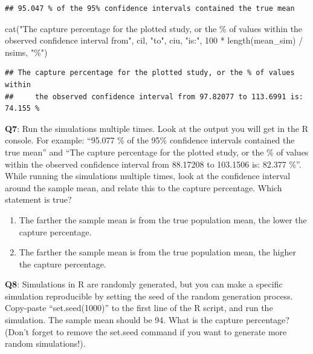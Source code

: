 \documentclass[
]{krantz}
\newenvironment{Shaded}{\begin{snugshade}}{\end{snugshade}}
\newcommand{\DecValTok}[1]{\textcolor[rgb]{0.00,0.00,0.81}{#1}}
\newcommand{\FunctionTok}[1]{\textcolor[rgb]{0.00,0.00,0.00}{#1}}
\newcommand{\NormalTok}[1]{#1}
\newcommand{\SpecialCharTok}[1]{\textcolor[rgb]{0.00,0.00,0.00}{#1}}
\newcommand{\StringTok}[1]{\textcolor[rgb]{0.31,0.60,0.02}{#1}}
\providecommand{\tightlist}{%
  \setlength{\itemsep}{0pt}\setlength{\parskip}{0pt}}
\begin{document}
\begin{verbatim}
## 95.047 % of the 95% confidence intervals contained the true mean
\end{verbatim}

\begin{Shaded}
\begin{Highlighting}[]
\FunctionTok{cat}\NormalTok{(}\StringTok{"The capture percentage for the plotted study, or the \% of values within}
\StringTok{    the observed confidence interval from"}\NormalTok{, cil, }\StringTok{"to"}\NormalTok{, ciu,}
    \StringTok{"is:"}\NormalTok{, }\DecValTok{100} \SpecialCharTok{*} \FunctionTok{length}\NormalTok{(mean\_sim) }\SpecialCharTok{/}\NormalTok{ nsims, }\StringTok{"\%"}\NormalTok{)}
\end{Highlighting}
\end{Shaded}

\begin{verbatim}
## The capture percentage for the plotted study, or the % of values within
##     the observed confidence interval from 97.82077 to 113.6991 is: 74.155 %
\end{verbatim}

\textbf{Q7}: Run the simulations multiple times. Look at the output you will get in the R console. For example: ``95.077 \% of the 95\% confidence intervals contained the true mean'' and ``The capture percentage for the plotted study, or the \% of values within the observed confidence interval from 88.17208 to 103.1506 is: 82.377 \%''. While running the simulations multiple times, look at the confidence interval around the sample mean, and relate this to the capture percentage. Which statement is true?

\begin{enumerate}
\def\labelenumi{\Alph{enumi})}
\tightlist
\item
  The farther the sample mean is from the true population mean, the lower the capture percentage.
\item
  The farther the sample mean is from the true population mean, the higher the capture percentage.
\end{enumerate}

\textbf{Q8}: Simulations in R are randomly generated, but you can make a specific simulation reproducible by setting the seed of the random generation process. Copy-paste ``set.seed(1000)'' to the first line of the R script, and run the simulation. The sample mean should be 94. What is the capture percentage? (Don't forget to remove the set.seed command if you want to generate more random simulations!).
\end{document}
